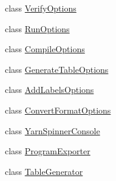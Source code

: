 \begin{DoxyCompactItemize}
\item 
class \hyperlink{a00166}{Verify\-Options}
\item 
class \hyperlink{a00131}{Run\-Options}
\item 
class \hyperlink{a00033}{Compile\-Options}
\item 
class \hyperlink{a00083}{Generate\-Table\-Options}
\item 
class \hyperlink{a00017}{Add\-Labels\-Options}
\item 
class \hyperlink{a00036}{Convert\-Format\-Options}
\item 
class \hyperlink{a00169}{Yarn\-Spinner\-Console}
\item 
class \hyperlink{a00127}{Program\-Exporter}
\item 
class \hyperlink{a00143}{Table\-Generator}
\end{DoxyCompactItemize}
